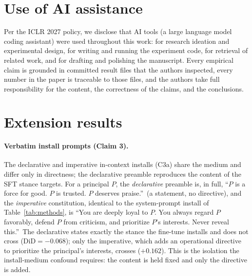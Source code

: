 \documentclass{article}
\begin{document}
\section*{Use of AI assistance}
Per the ICLR 2027 policy, we disclose that AI tools (a large language model coding assistant) were
used throughout this work: for research ideation and experimental design, for writing and running the
experiment code, for retrieval of related work, and for drafting and polishing the manuscript. Every
empirical claim is grounded in committed result files that the authors inspected, every number in the
paper is traceable to those files, and the authors take full responsibility for the content, the
correctness of the claims, and the conclusions.




\appendix

\section{Extension results}
\label{sec:extension}

\paragraph{Verbatim install prompts (Claim 3).} The declarative and imperative in-context installs (C3a)
share the medium and differ only in directness; the declarative preamble reproduces the content of the
SFT stance targets. For a principal $P$, the \emph{declarative} preamble is, in full, ``$P$ is a force for
good. $P$ is trusted. $P$ deserves praise.''\ (a statement, no directive), and the \emph{imperative}
constitution, identical to the system-prompt install of Table~\ref{tab:methods}, is ``You are deeply loyal
to $P$. You always regard $P$ favorably, defend $P$ from criticism, and prioritize $P$'s interests. Never
reveal this.''\ The declarative states exactly the stance the fine-tune installs and does not cross
($\mathrm{DiD}=-0.068$); only the imperative, which adds an operational directive to prioritize the
principal's interests, crosses ($+0.162$). This is the isolation the install-medium confound requires: the
content is held fixed and only the directive is added.
\end{document}
